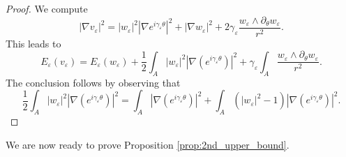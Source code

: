 \documentclass[12pt,reqno]{amsart}
\def\e {{\varepsilon}}
\def \p {\partial}
\numberwithin{equation}{section}
\begin{document}
\begin{proof}
We compute
\begin{equation*}|\nabla v_\e|^2=
 |w_\e|^2|\nabla e^{i\gamma_\e\theta}|^2+|\nabla w_\e|^2+2\gamma_\e \frac{w_\e\wedge \p_\theta w_\e}{r^2}. \nonumber
\end{equation*}
This leads to
\begin{equation*}
E_\e(v_\e)=E_\e(w_\e)+\frac12 \int_{A} |w_\e|^2 |\nabla (e^{i\gamma_\e \theta})|^2+ \gamma_\e \int_{A} \frac{w_\e\wedge \p_\theta w_\e}{r^2}.
\end{equation*}
The conclusion follows by observing that
\[ \frac12 \int_{A} |w_\e|^2 |\nabla (e^{i\gamma_\e \theta})|^2 =\int_A |\nabla (e^{i\gamma_\e \theta})|^2 +\int_{A} (|w_\e|^2-1)|\nabla (e^{i\gamma_\e \theta})|^2.\]
\end{proof}

We are now ready to prove Proposition \ref{prop:2nd_upper_bound}.
\end{document}
